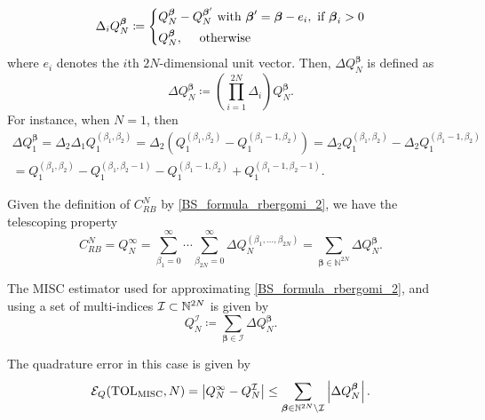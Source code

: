 \begin{equation}
\Delta_i Q_N^{\boldsymbol{\beta}} \coloneqq \left\{ 
\aligned 
 Q_N^{\boldsymbol{\beta}} &- Q_N^{\boldsymbol{\beta}'}  \text{ with } \boldsymbol{\beta}' =\boldsymbol{\beta} - e_i, \text{ if } \boldsymbol{\beta}_i>0 \\
 Q_N^{\boldsymbol{\beta}} &, \quad  \text{ otherwise}
\endaligned
\right.
\end{equation}
where $e_i$ denotes the $i$th $2N$-dimensional unit vector. Then, $\Delta
Q_N^{\boldsymbol{\beta}}$ is defined as
\begin{equation}
\Delta Q_N^{\boldsymbol{\beta}} \coloneqq \left( \prod_{i=1}^{2N} \Delta_i \right) Q_N^{\boldsymbol{\beta}}.
\end{equation}
For instance, when $N = 1$, then 
\begin{multline*}
	\Delta Q_1^{\boldsymbol{\beta}} = \Delta_2 \Delta_1 Q_1^{(\beta_1, \beta_2)} = \Delta_2\left( Q_1^{(\beta_1,
		\beta_2)} - Q_1^{(\beta_1-1,\beta_2)} \right) = \Delta_2 Q_1^{(\beta_1,
		\beta_2)} - \Delta_2 Q_1^{(\beta_1-1,\beta_2)} 
	\\= Q_1^{(\beta_1, \beta_2)} - Q_1^{(\beta_1, \beta_2-1)} - Q_1^{(\beta_1-1, \beta_2)} + Q_1^{(\beta_1-1, \beta_2-1)}.
\end{multline*}

Given the definition of $C_{RB}^{N}$ by \eqref{BS_formula_rbergomi_2}, we have the telescoping property
\begin{equation}
C_{RB}^{N}=Q_N^\infty = \sum_{\beta_1=0}^\infty \cdots \sum_{\beta_{2N} = 0}^\infty \Delta
Q_N^{(\beta_1, \ldots, \beta_{2N})} = \sum_{\boldsymbol{\beta} \in \mathbb{N}^{2N}} \Delta Q_N^{\boldsymbol{\beta}}.
\end{equation}


 The MISC estimator used for approximating \eqref{BS_formula_rbergomi_2}, and using a set of multi-indices $\mathcal{I}\subset \mathbb{N}^{2N}$ is given by
\begin{equation*}
	Q_N^{\mathcal{I}} \coloneqq \sum_{\boldsymbol{\beta} \in \mathcal{I}} \Delta Q_N^{\boldsymbol{\beta}}.
\end{equation*}

The quadrature error in this  case  is given by
\begin{equation}\label{eq:quadrature error}
	\mathcal{E}_Q(\text{TOL}_{\text{MISC}},N) =\left\lvert Q_N^\infty - Q_N^\mathcal{I}\right\rvert \le \sum_{\boldsymbol{\beta} \in \mathbb{N}^{2N} \setminus
		\mathcal{I}} \left\lvert\Delta Q_N^{\boldsymbol{\beta}}\right\rvert.
\end{equation}



